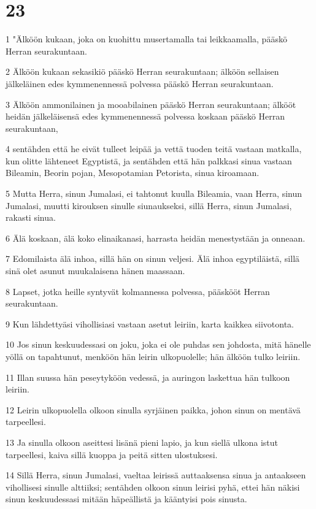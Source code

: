 \chapter{23}

\par 1 "Älköön kukaan, joka on kuohittu musertamalla tai leikkaamalla, pääskö Herran seurakuntaan.
\par 2 Älköön kukaan sekasikiö pääskö Herran seurakuntaan; älköön sellaisen jälkeläinen edes kymmenennessä polvessa pääskö Herran seurakuntaan.
\par 3 Älköön ammonilainen ja mooabilainen pääskö Herran seurakuntaan; älkööt heidän jälkeläisensä edes kymmenennessä polvessa koskaan pääskö Herran seurakuntaan,
\par 4 sentähden että he eivät tulleet leipää ja vettä tuoden teitä vastaan matkalla, kun olitte lähteneet Egyptistä, ja sentähden että hän palkkasi sinua vastaan Bileamin, Beorin pojan, Mesopotamian Petorista, sinua kiroamaan.
\par 5 Mutta Herra, sinun Jumalasi, ei tahtonut kuulla Bileamia, vaan Herra, sinun Jumalasi, muutti kirouksen sinulle siunaukseksi, sillä Herra, sinun Jumalasi, rakasti sinua.
\par 6 Älä koskaan, älä koko elinaikanasi, harrasta heidän menestystään ja onneaan.
\par 7 Edomilaista älä inhoa, sillä hän on sinun veljesi. Älä inhoa egyptiläistä, sillä sinä olet asunut muukalaisena hänen maassaan.
\par 8 Lapset, jotka heille syntyvät kolmannessa polvessa, pääskööt Herran seurakuntaan.
\par 9 Kun lähdettyäsi vihollisiasi vastaan asetut leiriin, karta kaikkea siivotonta.
\par 10 Jos sinun keskuudessasi on joku, joka ei ole puhdas sen johdosta, mitä hänelle yöllä on tapahtunut, menköön hän leirin ulkopuolelle; hän älköön tulko leiriin.
\par 11 Illan suussa hän peseytyköön vedessä, ja auringon laskettua hän tulkoon leiriin.
\par 12 Leirin ulkopuolella olkoon sinulla syrjäinen paikka, johon sinun on mentävä tarpeellesi.
\par 13 Ja sinulla olkoon aseittesi lisänä pieni lapio, ja kun siellä ulkona istut tarpeellesi, kaiva sillä kuoppa ja peitä sitten ulostuksesi.
\par 14 Sillä Herra, sinun Jumalasi, vaeltaa leirissä auttaaksensa sinua ja antaakseen vihollisesi sinulle alttiiksi; sentähden olkoon sinun leirisi pyhä, ettei hän näkisi sinun keskuudessasi mitään häpeällistä ja kääntyisi pois sinusta.
